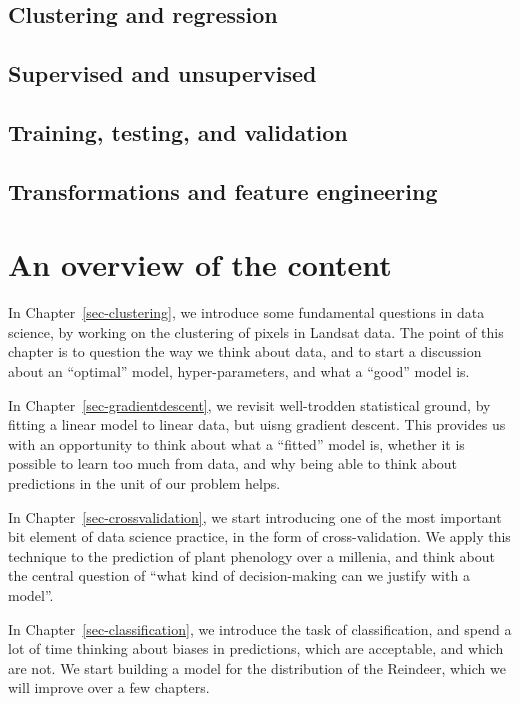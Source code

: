 \documentclass[
  letterpaper,
]{scrbook}
\begin{document}
\subsection{Clustering and regression}\label{clustering-and-regression}

\subsection{Supervised and
unsupervised}\label{supervised-and-unsupervised}

\subsection{Training, testing, and
validation}\label{training-testing-and-validation}

\subsection{Transformations and feature
engineering}\label{transformations-and-feature-engineering}

\section{An overview of the content}\label{an-overview-of-the-content}

In Chapter~\ref{sec-clustering}, we introduce some fundamental questions
in data science, by working on the clustering of pixels in Landsat data.
The point of this chapter is to question the way we think about data,
and to start a discussion about an ``optimal'' model, hyper-parameters,
and what a ``good'' model is.

In Chapter~\ref{sec-gradientdescent}, we revisit well-trodden
statistical ground, by fitting a linear model to linear data, but uisng
gradient descent. This provides us with an opportunity to think about
what a ``fitted'' model is, whether it is possible to learn too much
from data, and why being able to think about predictions in the unit of
our problem helps.

In Chapter~\ref{sec-crossvalidation}, we start introducing one of the
most important bit element of data science practice, in the form of
cross-validation. We apply this technique to the prediction of plant
phenology over a millenia, and think about the central question of
``what kind of decision-making can we justify with a model''.

In Chapter~\ref{sec-classification}, we introduce the task of
classification, and spend a lot of time thinking about biases in
predictions, which are acceptable, and which are not. We start building
a model for the distribution of the Reindeer, which we will improve over
a few chapters.
\end{document}
